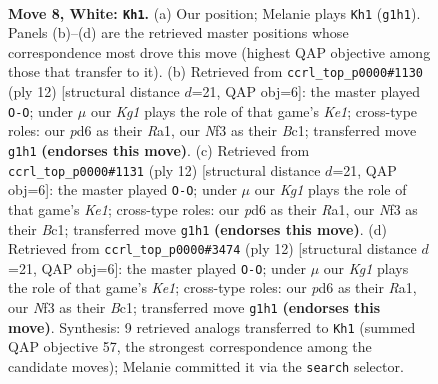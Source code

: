\documentclass[11pt]{article}
\begin{document}
\begin{figure}[p]\centering
\begin{subfigure}{0.46\textwidth}\centering
\resizebox{\linewidth}{!}{%
\newchessgame
\chessboard[
  setfen={rnbq1rk1/ppp1p1b1/3p1np1/5p1p/2PP4/2N2NP1/PP2PPBP/R1BQ1RK1 w - - 0 8},
  showmover=false,
  pgfstyle=straightmove, color=movearrow, markmove={g1-h1}
]}
\caption{}
\end{subfigure}\hfill
\begin{subfigure}{0.46\textwidth}\centering
\resizebox{\linewidth}{!}{%
\newchessgame
\chessboard[
  setfen={rnbq1rk1/ppp1p1bp/3p1np1/5p2/2PP4/2N2NP1/PP2PPBP/R1BQK2R w KQ - 2 7},
  showmover=false,
  pgfstyle=straightmove, color=movearrow, markmove={e1-g1}
]}
\caption{}
\end{subfigure}
\\[4pt]
\begin{subfigure}{0.46\textwidth}\centering
\resizebox{\linewidth}{!}{%
\newchessgame
\chessboard[
  setfen={rnbq1rk1/ppp1p1bp/3p1np1/5p2/2PP4/2N2NP1/PP2PPBP/R1BQK2R w KQ - 2 7},
  showmover=false,
  pgfstyle=straightmove, color=movearrow, markmove={e1-g1}
]}
\caption{}
\end{subfigure}\hfill
\begin{subfigure}{0.46\textwidth}\centering
\resizebox{\linewidth}{!}{%
\newchessgame
\chessboard[
  setfen={rnbq1rk1/ppp1p1bp/3p1np1/5p2/2PP4/2N2NP1/PP2PPBP/R1BQK2R w KQ - 0 7},
  showmover=false,
  pgfstyle=straightmove, color=movearrow, markmove={e1-g1}
]}
\caption{}
\end{subfigure}
\caption{\textbf{Move 8, White: \texttt{Kh1}.} (a) Our position; Melanie plays \texttt{Kh1} (\texttt{g1h1}). Panels (b)--(d) are the retrieved master positions whose correspondence most drove this move (highest QAP objective among those that transfer to it). (b) Retrieved from \texttt{ccrl\_top\_p0000\#1130} (ply 12) [structural distance $d$=21, QAP obj=6]: the master played \texttt{O-O}; under $\mu$ our \emph{Kg1} plays the role of that game's \emph{Ke1}; cross-type roles: our \emph{p}d6 as their \emph{R}a1, our \emph{N}f3 as their \emph{B}c1; transferred move \texttt{g1h1} \textbf{(endorses this move)}. (c) Retrieved from \texttt{ccrl\_top\_p0000\#1131} (ply 12) [structural distance $d$=21, QAP obj=6]: the master played \texttt{O-O}; under $\mu$ our \emph{Kg1} plays the role of that game's \emph{Ke1}; cross-type roles: our \emph{p}d6 as their \emph{R}a1, our \emph{N}f3 as their \emph{B}c1; transferred move \texttt{g1h1} \textbf{(endorses this move)}. (d) Retrieved from \texttt{ccrl\_top\_p0000\#3474} (ply 12) [structural distance $d$=21, QAP obj=6]: the master played \texttt{O-O}; under $\mu$ our \emph{Kg1} plays the role of that game's \emph{Ke1}; cross-type roles: our \emph{p}d6 as their \emph{R}a1, our \emph{N}f3 as their \emph{B}c1; transferred move \texttt{g1h1} \textbf{(endorses this move)}. Synthesis: 9 retrieved analogs transferred to \texttt{Kh1} (summed QAP objective 57, the strongest correspondence among the candidate moves); Melanie committed it via the \texttt{search} selector.}
\label{fig:thought-m14}
\end{figure}
\end{document}
